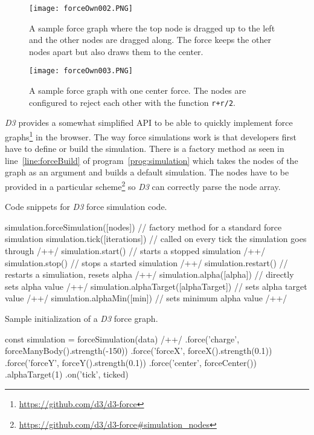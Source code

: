 \begin{figure}
  \centering
  \texttt{[image: forceOwn002.PNG]}
  \caption{A sample force graph where the top node is dragged up to the left and the other nodes are dragged along. The force keeps the other nodes apart but also draws them to the center.}
  \label{fig:force003}
\end{figure}

\begin{figure}
  \centering
  \texttt{[image: forceOwn003.PNG]}
  \caption{A sample force graph with one center force. The nodes are configured to reject each other with the function \texttt{r+r/2}.}
  \label{fig:force004}
\end{figure}

\emph{D3} provides a somewhat simplified API to be able to quickly implement force graphs\footnote{\url{https://github.com/d3/d3-force}} in the browser. The way force simulations work is that developers first have to define or build the simulation. There is a factory method as seen in line~\ref{line:forceBuild} of program~\ref{prog:simulation} which takes the nodes of the graph as an argument and builds a default simulation. The nodes have to be provided in a particular scheme\footnote{\url{https://github.com/d3/d3-force\#simulation_nodes}} so \emph{D3} can correctly parse the node array. 

\begin{program}
\caption{Code snippets for \emph{D3} force simulation code.}
\label{prog:simulation}
\begin{JsCode}
simulation.forceSimulation([nodes]) // factory method for a standard force simulation
simulation.tick([iterations]) // called on every tick the simulation goes through /+\label{line:manualTick}+/
simulation.start() // starts a stopped simulation /+\label{line:d3ForceStart}+/
simulation.stop() // stops a started simulation /+\label{line:d3ForceStop}+/
simulation.restart() // restarts a simuliation, resets alpha /+\label{line:d3ForceRestart}+/
simulation.alpha([alpha]) // directly sets alpha value /+\label{line:d3ForceAlphaSet}+/
simulation.alphaTarget([alphaTarget]) // sets alpha target value /+\label{line:d3ForceAlphaTarget}+/
simulation.alphaMin([min]) // sets minimum alpha value /+\label{line:d3ForceAlphaMin}+/
\end{JsCode}
\end{program}

\begin{program}
\caption{Sample initialization of a \emph{D3} force graph.}
\label{prog:d3forceinit}
\begin{JsCode}
const simulation = forceSimulation(data) /+\label{line:forceBuild}+/
  .force('charge', forceManyBody().strength(-150))
  .force('forceX', forceX().strength(0.1))
  .force('forceY', forceY().strength(0.1))
  .force('center', forceCenter())
  .alphaTarget(1)
  .on('tick', ticked)
\end{JsCode}
\end{program}

